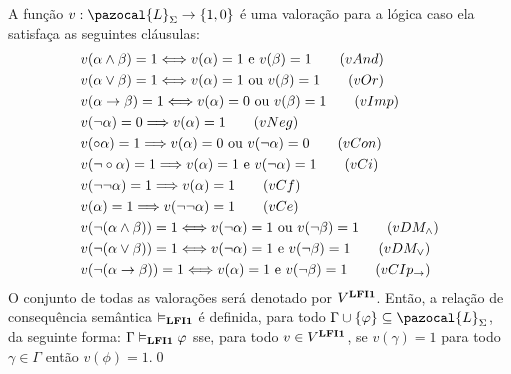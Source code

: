         \begin{definicao} \label{def:valoracoes}
            A função $v : \pazocal{L}_{\Sigma} \to \{1, 0\}$ é uma valoração para a lógica \lfium{} caso ela satisfaça as seguintes cláusulas:
            \begin{align*}
                & v(\alpha \land \beta) = 1 \Longleftrightarrow v(\alpha) = 1 \text{ e } v(\beta) = 1\tag{\textbf{$vAnd$}}\\
                & v(\alpha \lor \beta) = 1 \Longleftrightarrow v(\alpha) = 1 \text{ ou } v(\beta) = 1\tag{\textbf{$vOr$}}\\
                & v(\alpha \to \beta) = 1 \Longleftrightarrow v(\alpha) = 0 \text{ ou } v(\beta) = 1\tag{\textbf{$vImp$}}\\
                & v(\neg \alpha) = 0 \Longrightarrow v(\alpha) = 1\tag{\textbf{$vNeg$}}\\
                & v(\circ \alpha) = 1 \Longrightarrow v(\alpha) = 0 \text{ ou } v(\neg \alpha) = 0\tag{\textbf{$vCon$}}\\
                & v(\neg \circ \alpha) = 1 \Longrightarrow v(\alpha) = 1 \text{ e } v(\neg \alpha) = 1\tag{\textbf{$vCi$}}\\
                & v(\neg \neg \alpha) = 1 \Longrightarrow v(\alpha) = 1\tag{\textbf{$vCf$}}\\
                & v(\alpha) = 1 \Longrightarrow v(\neg \neg \alpha) = 1\tag{\textbf{$vCe$}}\\
                & v(\neg (\alpha \land \beta)) = 1 \Longleftrightarrow v(\neg \alpha) = 1 \text{ ou } v(\neg \beta) = 1\tag{\textbf{$vDM_{\land}$}}\\
                & v(\neg (\alpha \lor \beta)) = 1 \Longleftrightarrow v(\neg \alpha) = 1 \text{ e } v(\neg \beta) = 1\tag{\textbf{$vDM_{\lor}$}}\\
                & v(\neg (\alpha \to \beta)) = 1 \Longleftrightarrow v(\alpha) = 1 \text{ e } v(\neg \beta) = 1\tag{\textbf{$vCIp_{\to}$}}
            \end{align*}
            O conjunto de todas as valorações será denotado por $V^{\textbf{LFI1}{}}$. Então, a relação de consequência semântica $\vDash_{\textbf{LFI1}{}}$ é definida, para todo $\Gamma \cup \{\phi\} \subseteq \pazocal{L}_{\Sigma}$, da seguinte forma: $\Gamma \vDash_{\textbf{LFI1}{}} \varphi$ sse, para todo $v \in V^{\textbf{LFI1}{}}$, se $v(\gamma) = 1$ para todo $\gamma \in \Gamma$ então $v(\phi) = 1$.\qed{}
        \end{definicao}


